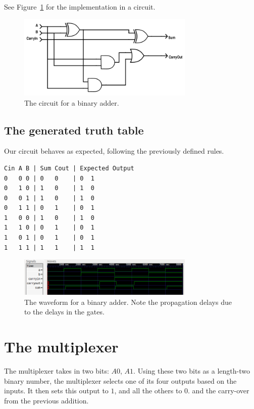 \documentclass[]{article}
\begin{document}
See Figure~\ref{adder} for the implementation in a circuit.
	
\begin{figure}[H]
	\label{adder}
	\centering
	\includegraphics[width=0.75\textwidth]{adder.png}
				
	\caption{The circuit for a binary adder.}
\end{figure}

\subsection{The generated truth table}

Our circuit behaves as expected, following the previously defined rules.

\begin{lstlisting}
Cin A B | Sum Cout | Expected Output
0   0 0 | 0   0    | 0  1
0   1 0 | 1   0    | 1  0
0   0 1 | 1   0    | 1  0
0   1 1 | 0   1    | 0  1
1   0 0 | 1   0    | 1  0
1   1 0 | 0   1    | 0  1
1   0 1 | 0   1    | 0  1
1   1 1 | 1   1    | 1  1
\end{lstlisting}

\begin{figure}[H]
	\centering
	\includegraphics[width=0.75\textwidth]{../wave_forms/adder_wave.png}
				
	\caption{The waveform for a binary adder. Note the propagation delays due to the delays in the gates.}
\end{figure}

\section{The multiplexer}

The multiplexer takes in two bits: $A0$, $A1$. Using these two bits as a length-two binary number, the multiplexer selects one of its four outputs based on the inputs. It then sets this output to $1$, and all the others to $0$. and the carry-over from the previous addition.
\end{document}
